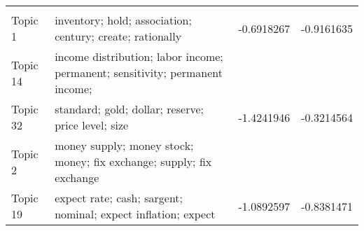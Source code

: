 \documentclass[
  12pt,
  onecolumn]{article}
\begin{document}
\begin{longtable}[t]{llrr}
\cellcolor{gray!6}{profit} & \cellcolor{gray!6}{-0.2943298} & \cellcolor{gray!6}{-1.1323866}\\
\addlinespace
Topic 1 & inventory;
hold;
association;
century;
create;
rationally & -0.6918267 & -0.9161635\\
Topic 14 & income
distribution;
labor
income;
permanent;
sensitivity;
permanent
income;
\cellcolor{gray!6}{income} & \cellcolor{gray!6}{-0.6398314} & \cellcolor{gray!6}{-1.0056349}\\
Topic 32 & standard;
gold;
dollar;
reserve;
price
level;
size & -1.4241946 & -0.3214564\\
Topic 2 & money
supply;
money
stock;
money;
fix
exchange;
supply;
fix
exchange
\cellcolor{gray!6}{rate} & \cellcolor{gray!6}{-0.8160845} & \cellcolor{gray!6}{-1.1001257}\\
Topic 19 & expect
rate;
cash;
sargent;
nominal;
expect
inflation;
expect & -1.0892597 & -0.8381471\\*
\end{longtable}
\endgroup{}

\begingroup\fontsize{7}{9}\selectfont
\end{document}
